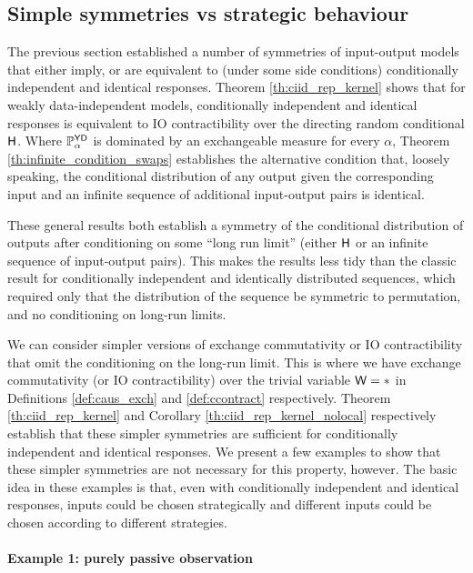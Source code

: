 \subsection{Simple symmetries vs strategic behaviour}

The previous section established a number of symmetries of input-output models that either imply, or are equivalent to (under some side conditions) conditionally independent and identical responses. Theorem \ref{th:ciid_rep_kernel} shows that for weakly data-independent models, conditionally independent and identical responses is equivalent to IO contractibility over the directing random conditional $\mathsf{H}$. Where $\mathbb{P}_\alpha^{\mathsf{YD}}$ is dominated by an exchangeable measure for every $\alpha$, Theorem \ref{th:infinite_condition_swaps} establishes the alternative condition that, loosely speaking, the conditional distribution of any output given the corresponding input and an infinite sequence of additional input-output pairs is identical.

These general results both establish a symmetry of the conditional distribution of outputs after conditioning on some ``long run limit'' (either $\mathsf{H}$ or an infinite sequence of input-output pairs). This makes the results less tidy than the classic result for conditionally independent and identically distributed sequences, which required only that the distribution of the sequence be symmetric to permutation, and no conditioning on long-run limits.

We can consider simpler versions of exchange commutativity or IO contractibility that omit the conditioning on the long-run limit. This is where we have exchange commutativity (or IO contractibility) over the trivial variable $\mathsf{W}=*$ in Definitions \ref{def:caus_exch} and \ref{def:ccontract} respectively. Theorem \ref{th:ciid_rep_kernel} and Corollary \ref{th:ciid_rep_kernel_nolocal} respectively establish that these simpler symmetries are sufficient for conditionally independent and identical responses. We present a few examples to show that these simpler symmetries are not necessary for this property, however. The basic idea in these examples is that, even with conditionally independent and identical responses, inputs could be chosen strategically and different inputs could be chosen according to different strategies.

\paragraph{Example 1: purely passive observation}\label{pgph:passive_strategic}

